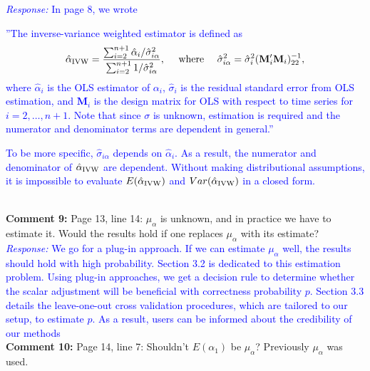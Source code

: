 \documentclass[12pt]{article}
\newcommand{\response}[1]{\noindent \textcolor{blue}{\emph{Response:} #1}}
\begin{document}
\response{In page 8, we wrote \\
\begin{tcolorbox}
''The inverse-variance weighted estimator is defined as 
\begin{align*}
  \hat{\alpha}_{\rm IVW} = \frac{\sum_{i=2}^{n+1} \hat{\alpha}_i / \hat{\sigma}_{i\alpha}^2}{\sum_{i=2}^{n+1} 1/\hat{\sigma}_{i\alpha}^2},
  \quad \text{ where } \quad  \hat{\sigma}_{i\alpha}^2 = \hat{\sigma}^2_i( \mathbf{M}_i'\mathbf{M}_i)_{22}^{-1},
\end{align*}
where  $\hat{\alpha}_i$ is the OLS estimator of $\alpha_i$, 
$\hat{\sigma}_i$ is the residual standard error from OLS estimation, 
and $\mathbf{M}_i$ is the design matrix for OLS with respect to time series 
for $i = 2, \ldots, n+1$. Note that since $\sigma$ is unknown, estimation 
is required and the numerator and denominator terms are dependent in general.''
\end{tcolorbox}
To be more specific, $\hat{\sigma}_{i\alpha}$ depends on $\hat{\alpha}_i$. As a result, the numerator and denominator of $ \hat{\alpha}_{\rm IVW}$ are dependent. Without making distributional assumptions, it is impossible to evaluate $E(\hat{\alpha}_{\rm IVW})$ and $Var(\hat{\alpha}_{\rm IVW})$ in a closed form.}\\

{\bf Comment 9:} Page 13, line 14: $\mu_{\alpha}$ is unknown, and in practice we have to estimate it. Would the results hold if one replaces $\mu_{\alpha}$ with its estimate? \\

\response{We go for a plug-in approach. If we can estimate $\mu_{\alpha}$ well, the results should hold with high probability. Section 3.2 is dedicated to this estimation problem. Using plug-in approaches, we get a decision rule to determine whether the scalar adjustment will be beneficial with correctness probability $p$. Section 3.3 details the leave-one-out cross validation procedures, which are tailored to our setup, to estimate $p$. As a result, users can be informed about the credibility of our methods} \\


{\bf Comment 10:} Page 14, line 7: Shouldn’t $E(\alpha_1)$ be $\mu_{\alpha}$? Previously $\mu_{\alpha}$ was used.\\
\end{document}
